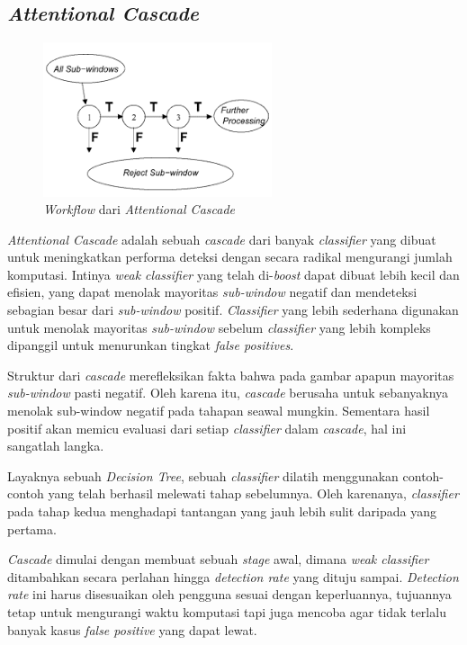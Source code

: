 \subsection{\emph{Attentional Cascade}}

\begin{figure}[H]
  \centering{}
	\includegraphics[width=0.6\textwidth]{gambar/cascade}
  \caption{\textit{Workflow} dari \emph{Attentional Cascade}}
\end{figure}

\emph{Attentional Cascade} adalah sebuah \emph{cascade} dari banyak 
\emph{classifier} yang dibuat untuk meningkatkan performa deteksi dengan secara radikal mengurangi jumlah 
komputasi. Intinya \emph{weak classifier} yang telah di-\emph{boost} dapat dibuat lebih 
kecil dan efisien, yang dapat menolak mayoritas \emph{sub-window} negatif dan 
mendeteksi sebagian besar dari \emph{sub-window} positif. \emph{Classifier} yang lebih 
sederhana digunakan untuk menolak mayoritas \emph{sub-window} sebelum \emph{classifier} 
yang lebih kompleks dipanggil untuk menurunkan tingkat \emph{false positives}.

Struktur dari \emph{cascade} merefleksikan 
fakta bahwa pada gambar apapun mayoritas \emph{sub-window} pasti negatif. 
Oleh karena itu, \emph{cascade} berusaha untuk sebanyaknya menolak sub-window 
negatif pada tahapan seawal mungkin. Sementara hasil positif 
akan memicu evaluasi dari setiap \emph{classifier} dalam \emph{cascade}, 
hal ini sangatlah langka.

Layaknya sebuah \emph{Decision Tree}, sebuah \emph{classifier} dilatih menggunakan 
contoh-contoh yang telah berhasil melewati tahap sebelumnya. Oleh karenanya, 
\emph{classifier} pada tahap kedua menghadapi tantangan yang jauh lebih sulit 
daripada yang pertama.

\emph{Cascade} dimulai dengan membuat sebuah \textit{stage} awal, dimana \textit{weak classifier} 
ditambahkan secara perlahan hingga \emph{detection rate} yang dituju sampai. \emph{Detection rate} 
ini harus disesuaikan oleh pengguna sesuai dengan keperluannya, tujuannya tetap untuk mengurangi 
waktu komputasi tapi juga mencoba agar tidak terlalu banyak kasus \emph{false positive} yang dapat 
lewat.

